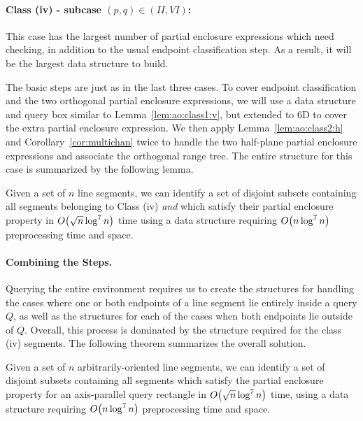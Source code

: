 \paragraph{Class (iv) - subcase $(p, q) \in (II, VI)$:} 
This case has the largest number of partial enclosure expressions which need 
checking, in addition to the usual endpoint classification step. 
As a result, it will be the largest data structure to build.

The basic steps are just as in the last three cases. 
To cover endpoint classification and the two orthogonal partial enclosure 
expressions, we will use a data structure and query box similar to 
Lemma~\ref{lem:ao:class1:v}, but extended to 6D to cover the extra partial 
enclosure expression.
We then apply Lemma~\ref{lem:ao:class2:h} and Corollary~\ref{cor:multichan} 
twice to handle the two half-plane partial enclosure expressions and associate 
the orthogonal range tree. 
The entire structure for this case is summarized by the following lemma.

\begin{lemma}
\label{lem:ao:class4:c}
Given a set of $n$ line segments, we can identify a set of disjoint subsets 
containing all segments belonging to Class (iv) \emph{and} which satisfy their 
partial enclosure property in $O\!\left(\sqrt{n}\log^7{n}\right)$ time using a data 
structure requiring $O\!\left(n\log^7{n}\right)$ preprocessing time and space.
\end{lemma}


\paragraph{Combining the Steps.} 

Querying the entire environment requires us to create the structures for 
handling the cases where one or both endpoints of a line segment lie entirely 
inside a query $Q$, as well as the structures for each of the cases when both 
endpoints lie outside of $Q$. 
Overall, this process is dominated by the structure required for the class (iv) 
segments. 
The following theorem summarizes the overall solution.

\begin{theorem}
\label{th:ao}
Given a set of $n$ arbitrarily-oriented line segments, we can identify a set of 
disjoint subsets containing all segments which satisfy the partial enclosure 
property for an axis-parallel query rectangle in $O\!\left(\sqrt{n}\log^7{n}\right)$ 
time, using a data structure requiring $O\!\left(n\log^7{n}\right)$ preprocessing time 
and space.
\end{theorem}


